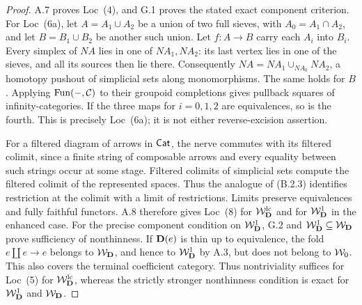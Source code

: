 \begin{proof}
A.7 proves Loc~(4), and G.1 proves the stated exact component
criterion. For Loc~(6a), let $A=A_1\cup A_2$ be a union of
two full sieves, with $A_0=A_1\cap A_2$, and let
$B=B_1\cup B_2$ be another such union. Let $f:A\to B$ carry
each $A_i$ into $B_i$. Every simplex of $NA$ lies in one of
$NA_1,NA_2$: its last vertex lies in one of the sieves, and all
its sources then lie there. Consequently
$NA=NA_1\cup_{NA_0}NA_2$, a homotopy pushout of simplicial
sets along monomorphisms. The same holds for $B$. Applying
$\operatorname{Fun}(-,\mathcal C)$ to their groupoid completions gives
pullback squares of infinity-categories. If the three maps for
$i=0,1,2$ are equivalences, so is the fourth. This is precisely
Loc~(6a); it is not either reverse-excision assertion.

For a filtered diagram of arrows in $\mathsf{Cat}$, the nerve commutes
with its filtered colimit, since a finite string of composable
arrows and every equality between such strings occur at some
stage. Filtered colimits of simplicial sets compute the filtered
colimit of the represented spaces. Thus the analogue of (B.2.3)
identifies restriction at the colimit with a limit of restrictions.
Limits preserve equivalences and fully faithful functors. A.8
therefore gives Loc~(8) for $\mathcal W_{\mathbf D}^{\mathrm{lc}}$ and for $\mathcal W_{\mathbf D}^{1}$ in the
enhanced case. For the precise component condition on $\mathcal W_{\mathbf D}^{1}$,
G.2 and $\mathcal W_{\mathbf D}^{1}\subseteq\mathcal W_{\mathbf D}$ prove sufficiency of nonthinness.
If $\mathbf D(e)$ is thin up to equivalence, the fold $e\amalg e\to e$
belongs to $\mathcal W_{\mathbf D}$, and hence to $\mathcal W_{\mathbf D}^{1}$ by A.3, but does not
belong to $\mathcal W_0$. This also covers the terminal coefficient
category. Thus nontriviality suffices for Loc~(5) for $\mathcal W_{\mathbf D}^{\mathrm{lc}}$,
whereas the strictly stronger nonthinness condition is exact
for $\mathcal W_{\mathbf D}^{1}$ and $\mathcal W_{\mathbf D}$.


\end{proof}
